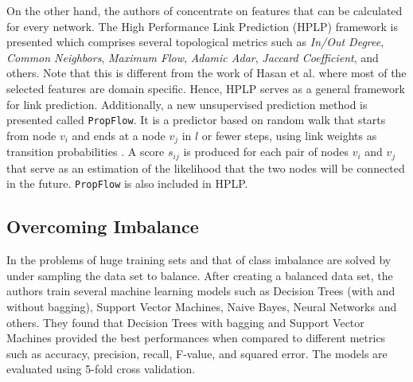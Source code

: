 \documentclass{acm_proc_article-sp}
\begin{document}
On the other hand, the authors of \cite{Lichtenwalter:2010:NPM:1835804.1835837} concentrate on features that can be calculated for every network. The High Performance Link Prediction (HPLP) framework is presented which comprises several topological metrics such as \textit{In/Out Degree}, \textit{Common Neighbors}, \textit{Maximum Flow}, \textit{Adamic Adar}, \textit{Jaccard Coefficient}, and others. Note that this is different from the work of Hasan et al. \cite{Hasan06linkprediction} where most of the selected features are domain specific. Hence, HPLP serves as a general framework for link prediction. Additionally, a new unsupervised prediction method is presented called \texttt{PropFlow}. It is a predictor based on random walk that starts from node $v_i$ and ends at a node $v_j$ in $l$ or fewer steps, using link weights as transition probabilities \cite{Lichtenwalter:2010:NPM:1835804.1835837}. A score $s_{ij}$ is produced for each pair of nodes $v_i$ and $v_j$ that serve as an estimation of the likelihood that the two nodes will be connected in the future. \texttt{PropFlow} is also included in HPLP.


\subsection{Overcoming Imbalance}

In \cite{Hasan06linkprediction} the problems of huge training sets and that of class imbalance are solved by under sampling the data set to balance. After creating a balanced data set, the authors train several machine learning models such as Decision Trees (with and without bagging), Support Vector Machines, Naive Bayes, Neural Networks and others. They found that Decision Trees with bagging and Support Vector Machines provided the best performances when compared to different metrics such as accuracy, precision, recall, F-value, and squared error. The models are evaluated using 5-fold cross validation.
\end{document}
